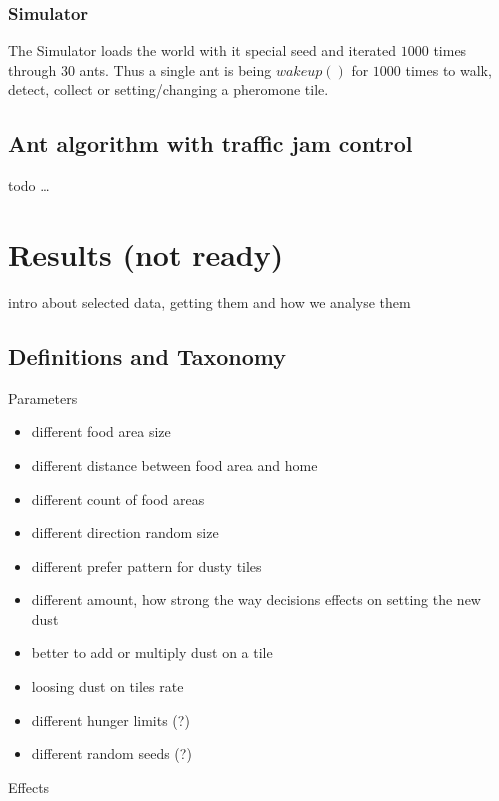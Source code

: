 \subsubsection{Simulator}\label{simulator}

The Simulator loads the world with it special seed and iterated \(1000\)
times through \(30\) ants. Thus a single ant is being \(wakeup()\) for
\(1000\) times to walk, detect, collect or setting/changing a pheromone
tile.

\subsection{Ant algorithm with traffic jam
control}\label{ant-algorithm-with-traffic-jam-control}

todo \ldots{}

\section{Results (not ready)}\label{results-not-ready}

intro about selected data, getting them and how we analyse them

\subsection{Definitions and Taxonomy}\label{definitions-and-taxonomy}

Parameters

\begin{itemize}
\tightlist
\item
  different food area size
\item
  different distance between food area and home
\item
  different count of food areas
\item
  different direction random size
\item
  different prefer pattern for dusty tiles
\item
  different amount, how strong the way decisions effects on setting the
  new dust
\item
  better to add or multiply dust on a tile
\item
  loosing dust on tiles rate
\item
  different hunger limits (?)
\item
  different random seeds (?)
\end{itemize}

Effects

